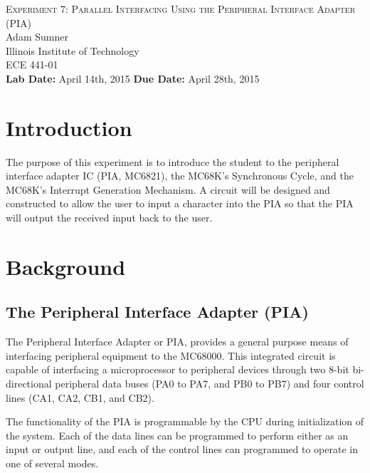 \documentclass[12pt,Letter]{article}
\begin{document}
\begin{titlepage}
	\begin{center}
		
		
		\vfill
		
		\textsc{\LARGE Experiment 7: Parallel Interfacing Using the Peripheral Interface Adapter (PIA)}\\[1.5cm]
		
		\Large Adam Sumner\\[0.5cm]
		
		\Large Illinois Institute of Technology\\[0.5cm]
		
		\Large ECE 441-01\\[0.5cm]	
		\noindent
		\vfill
		\large \textbf{Lab Date:} April 14th, 2015\hfill
		\large \textbf{Due Date:} April 28th, 2015
		
		
	\end{center}
\end{titlepage}

\section{Introduction}
The purpose of this experiment is to introduce the student to the peripheral interface adapter IC (PIA, MC6821), the MC68K's Synchronous Cycle, and the MC68K's Interrupt Generation Mechanism. A circuit will be designed and constructed to allow the user to input a character into the PIA so that the PIA will output the received input back to the user.
\section{Background}
\subsection{The Peripheral Interface Adapter (PIA)}
The Peripheral Interface Adapter or PIA, provides a general purpose means of interfacing
peripheral equipment to the MC68000. This integrated circuit is capable of interfacing a microprocessor to peripheral devices through two 8-bit bi-directional peripheral data buses (PA0 to PA7, and PB0 to PB7) and four control lines (CA1, CA2, CB1, and CB2)\cite{expman}.

The functionality of the PIA is programmable by the CPU during initialization of the system. Each of the data lines can be programmed to perform either as an input or output line, and each of the control lines can programmed to operate in one of several modes\cite{expman}.
\end{document}
